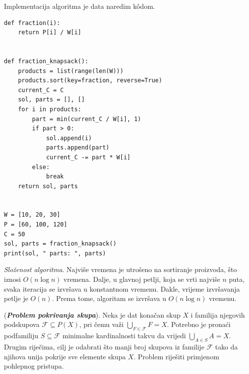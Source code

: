   Implementacija algoritma je data naredim k\^odom. 
   
   \begin{verbatim}
def fraction(i):
    return P[i] / W[i]


def fraction_knapsack():
    products = list(range(len(W)))
    products.sort(key=fraction, reverse=True)
    current_C = C
    sol, parts = [], []
    for i in products:
        part = min(current_C / W[i], 1)
        if part > 0:
            sol.append(i)
            parts.append(part)
            current_C -= part * W[i]
        else:
            break
    return sol, parts


W = [10, 20, 30]
P = [60, 100, 120]
C = 50
sol, parts = fraction_knapsack()
print(sol, " parts: ", parts)
\end{verbatim}

\textit{Složenost algoritma}.  Najviše vremena je utrošeno na sortiranje proi\-zvoda, što iznosi $O(n \log n)$ vremena. Dalje, u glavnoj petlji, koja se vrti najviše $n$ puta,  svaka iteracija se izvršava u konstantnom vremenu. Dakle, vrijeme izvršavanja petlje je $O(n)$. Prema tome, algoritam se izvršava u $O(n \log n)$ vremenu. %



\begin{example}
	(\textbf{\emph{Problem pokrivanja skupa}}). 	Neka je dat konačan skup $X$ i familija njegovih podskupova
	$\mathcal{F}\subseteq P(X)$, pri čemu važi 	$\bigcup_{F\in \mathcal{F}} F = X.$ Potrebno je pronaći podfamiliju $S\subseteq \mathcal{F}$ minimalne kardinalnosti takvu da vrijedi $\bigcup_{A\in S} A = X.$ \\
	
	Drugim riječima, cilj je odabrati što manji broj skupova iz familije $\mathcal{F}$ tako da njihova unija pokrije sve elemente skupa $X$. Problem riješiti primjenom pohlepnog pristupa.
\end{example}

